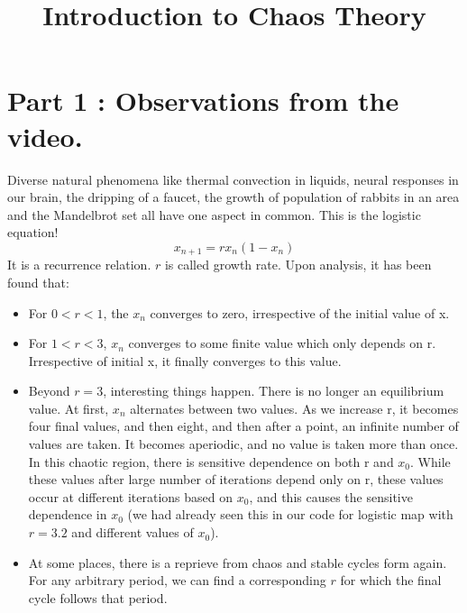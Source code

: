 \documentclass{article}
\title{Introduction to Chaos Theory}
\date{}
\begin{document}
\maketitle

\section*{Part 1 : Observations from the video.}
Diverse natural phenomena like thermal convection in liquids, neural responses in our brain, the dripping of a faucet, the growth of population of rabbits in an area and the Mandelbrot set all have one aspect in common. This is the logistic equation!
\begin{equation}
        x_{n+1} = rx_n(1-x_n)
\end{equation}
It is a recurrence relation. $r$ is called growth rate. Upon analysis, it has been found that:
\begin{itemize}
    \item For $0<r<1$, the $x_n$ converges to zero, irrespective of the initial value of x.
    \item For $1<r<3$,  $x_n$ converges to some finite value which only depends on r. Irrespective of initial x, it finally converges to this value.
    \item Beyond $r = 3$, interesting things happen. There is no longer an equilibrium value. At first, $x_n$ alternates between two values. As we increase r, it becomes four final values, and then eight, and then after a point, an infinite number of values are taken. It becomes aperiodic, and no value is taken more than once. In this chaotic region, there is sensitive dependence on both r and $x_0$. While these values after large number of iterations depend only on r, these values occur at different iterations based on  $x_0$, and this causes the sensitive dependence in $x_0$ (we had already seen this in our code for logistic map with $r = 3.2$ and different values of $x_0$).  
    \item At some places, there is a reprieve from chaos and stable cycles form again. For any arbitrary period, we can find a corresponding $r$ for which the final cycle follows that period.
\end{itemize}
\end{document}

